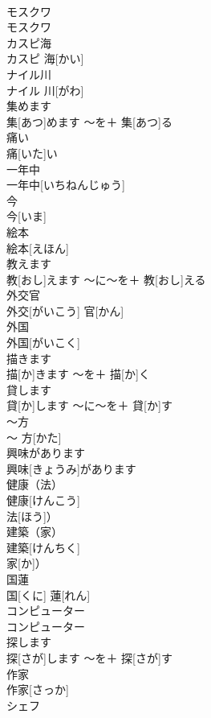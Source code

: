 \documentclass[8pt]{extreport}
\begin{document}
\begin{CJK}{UTF8}{min}
\\	モスクワ	
\\	モスクワ		
\\	カスピ海	
\\	カスピ 海[かい]		
\\	ナイル川	
\\	ナイル 川[がわ]		
\\	集めます	
\\	集[あつ]めます	〜を＋ 集[あつ]る	
\\	痛い	
\\	痛[いた]い		
\\	一年中	
\\	一年中[いちねんじゅう]		
\\	今	
\\	今[いま]		
\\	絵本	
\\	絵本[えほん]		
\\	教えます	
\\	教[おし]えます	〜に〜を＋ 教[おし]える	
\\	外交官	
\\	外交[がいこう] 官[かん]		
\\	外国	
\\	外国[がいこく]		
\\	描きます	
\\	描[か]きます	〜を＋ 描[か]く	
\\	貸します	
\\	貸[か]します	〜に〜を＋ 貸[か]す	
\\	〜方	
\\	〜 方[かた]		
\\	興味があります	
\\	興味[きょうみ]があります		
\\	健康（法）	
\\	健康[けんこう]
\\	法[ほう]）		
\\	建築（家）	
\\	建築[けんちく]
\\	家[か]）		
\\	国蓮	
\\	国[くに] 蓮[れん]		
\\	コンピューター	
\\	コンピューター		
\\	探します	
\\	探[さが]します	〜を＋ 探[さが]す	
\\	作家	
\\	作家[さっか]		
\\	シェフ	

\end{CJK}
\end{document}

